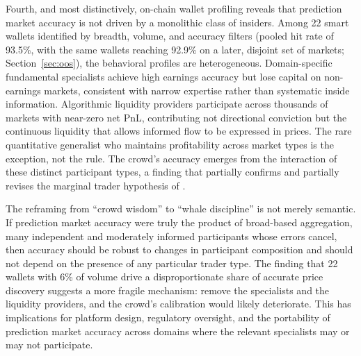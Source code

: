 \documentclass[11pt]{article}
\begin{document}
Fourth, and most distinctively, on-chain wallet profiling reveals that prediction market accuracy is not driven by a monolithic class of insiders. Among 22 smart wallets identified by breadth, volume, and accuracy filters (pooled hit rate of 93.5\%, with the same wallets reaching 92.9\% on a later, disjoint set of markets; Section~\ref{sec:oos}), the behavioral profiles are heterogeneous. Domain-specific fundamental specialists achieve high earnings accuracy but lose capital on non-earnings markets, consistent with narrow expertise rather than systematic inside information. Algorithmic liquidity providers participate across thousands of markets with near-zero net PnL, contributing not directional conviction but the continuous liquidity that allows informed flow to be expressed in prices. The rare quantitative generalist who maintains profitability across market types is the exception, not the rule. The crowd's accuracy emerges from the interaction of these distinct participant types, a finding that partially confirms and partially revises the marginal trader hypothesis of \citet{forsythe1992anatomy}.

The reframing from ``crowd wisdom'' to ``whale discipline'' is not merely semantic. If prediction market accuracy were truly the product of broad-based aggregation, many independent and moderately informed participants whose errors cancel, then accuracy should be robust to changes in participant composition and should not depend on the presence of any particular trader type. The finding that 22 wallets with 6\% of volume drive a disproportionate share of accurate price discovery suggests a more fragile mechanism: remove the specialists and the liquidity providers, and the crowd's calibration would likely deteriorate. This has implications for platform design, regulatory oversight, and the portability of prediction market accuracy across domains where the relevant specialists may or may not participate.
\end{document}
